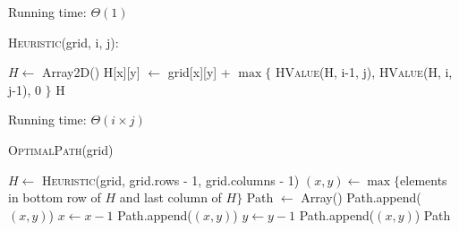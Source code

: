 \documentclass[12pt,letterpaper]{article}
\begin{document}
Running time: $\Theta(1)$

\textsc{Heuristic}(grid, i, j):
\begin{algorithmic}
\State $H \gets$ Array2D()
		\State H[x][y] $\gets$ grid[x][y] + $\max \{$ \textsc{HValue}(H, i-1, j), \textsc{HValue}(H, i, j-1), 0  $\}$
	\EndFor
\EndFor
\State \Return H
\end{algorithmic}

Running time: $\Theta(i \times j)$

\newpage

\textsc{OptimalPath}(grid)
\begin{algorithmic}
\State $H \gets$ \textsc{Heuristic}(grid, grid.rows - 1, grid.columns - 1)
\State $(x, y) \gets \max \{ $elements in bottom row of $H$ and last column of $H \}$
\State Path $\gets$ Array()
\State Path.append($(x, y)$)
		\State $x \gets x - 1$
		\State Path.append($(x, y)$)
	\Else
		\State $y \gets y - 1$
		\State Path.append($(x, y)$)
	\EndIf 
\EndWhile
\State \Return Path
\end{algorithmic}
\end{document}
